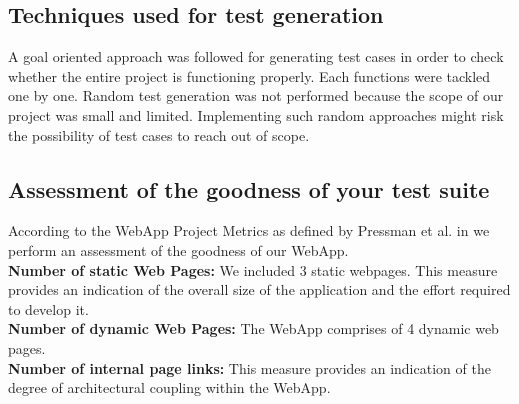 \documentclass[11pt]{article} %
\begin{document}
	
	
	
	
	
	
	
	
	
	
	\subsection{Techniques used for test generation}
	A goal oriented approach was followed for generating test cases in order to check whether the entire project is functioning properly. Each functions were tackled one by one. Random test generation was not performed because the scope of our project was small and limited. Implementing such random approaches might risk the possibility of test cases to reach out of scope.
	\subsection{Assessment of the goodness of your test suite}
	According to the WebApp Project Metrics as defined by Pressman et al. in \cite{DUMMY:1} we perform an assessment of the goodness of our WebApp.\\
	\textbf{Number of static Web Pages:} We included 3 static webpages. This measure  provides an indication of the overall size of the application and the effort required to develop it.\\
	\textbf{Number of dynamic Web Pages:} The WebApp comprises of 4 dynamic web pages.\\
	\textbf{Number of internal page links:} This measure provides an indication of the degree of architectural coupling within the WebApp.\\
\end{document}
